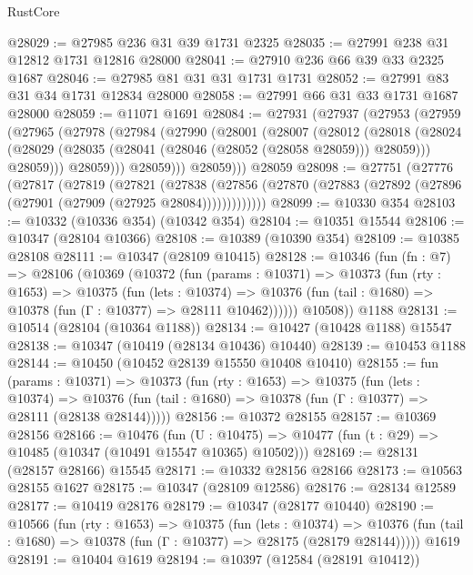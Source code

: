 \begin{lexlean}{RustCore}
\begin{coremodule}
@28029 := @27985 @236 @31 @39 @1731 @2325
@28035 := @27991 @238 @31 @12812 @1731 @12816 @28000
@28041 := @27910 @236 @66 @39 @33 @2325 @1687
@28046 := @27985 @81 @31 @31 @1731 @1731
@28052 := @27991 @83 @31 @34 @1731 @12834 @28000
@28058 := @27991 @66 @31 @33 @1731 @1687 @28000
@28059 := @11071 @1691
@28084 := @27931
    (@27937
      (@27953
        (@27959
          (@27965
            (@27978
              (@27984
                (@27990
                  (@28001
                    (@28007
                      (@28012
                        (@28018
                          (@28024
                            (@28029 (@28035 (@28041 (@28046 (@28052 (@28058 @28059))) @28059)))
                            @28059)))
                      @28059)))
                @28059)))
          @28059)))
    @28059
@28098 := @27751
    (@27776
      (@27817
        (@27819
          (@27821
            (@27838
              (@27856 (@27870 (@27883 (@27892 (@27896 (@27901 (@27909 (@27925 @28084)))))))))))))
@28099 := @10330 @354
@28103 := @10332 (@10336 @354) (@10342 @354)
@28104 := @10351 @15544
@28106 := @10347 (@28104 @10366)
@28108 := @10389 (@10390 @354)
@28109 := @10385 @28108
@28111 := @10347 (@28109 @10415)
@28128 := @10346
    (fun (fn : @7) =>
    @28106
      (@10369
        (@10372
          (fun (params : @10371) =>
          @10373
            (fun (rty : @1653) =>
            @10375
              (fun (lets : @10374) =>
              @10376 (fun (tail : @1680) => @10378 (fun (Γ : @10377) => @28111 @10462))))))
        @10508))
    @1188
@28131 := @10514 (@28104 (@10364 @1188))
@28134 := @10427 (@10428 @1188) @15547
@28138 := @10347 (@10419 (@28134 @10436) @10440)
@28139 := @10453 @1188
@28144 := @10450 (@10452 @28139 @15550 @10408 @10410)
@28155 := fun (params : @10371) =>
  @10373
    (fun (rty : @1653) =>
    @10375
      (fun (lets : @10374) =>
      @10376 (fun (tail : @1680) => @10378 (fun (Γ : @10377) => @28111 (@28138 @28144)))))
@28156 := @10372 @28155
@28157 := @10369 @28156
@28166 := @10476
    (fun (U : @10475) => @10477 (fun (t : @29) => @10485 (@10347 (@10491 @15547 @10365) @10502)))
@28169 := @28131 (@28157 @28166) @15545
@28171 := @10332 @28156 @28166
@28173 := @10563 @28155 @1627
@28175 := @10347 (@28109 @12586)
@28176 := @28134 @12589
@28177 := @10419 @28176
@28179 := @10347 (@28177 @10440)
@28190 := @10566
    (fun (rty : @1653) =>
    @10375
      (fun (lets : @10374) =>
      @10376 (fun (tail : @1680) => @10378 (fun (Γ : @10377) => @28175 (@28179 @28144)))))
    @1619
@28191 := @10404 @1619
@28194 := @10397 (@12584 (@28191 @10412))

\end{coremodule}
\end{lexlean}
